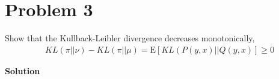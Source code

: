 \documentclass[5pt]{article}
\newcommand{\E}{\mathrm{E}}
\begin{document}
\pagebreak

\section{Problem 3}
Show that the Kullback-Leibler divergence decreases monotonically,
\begin{align}
	& KL \left( \pi || \nu \right) - KL \left( \pi || \mu \right) = \E\left[
	KL \left( P \left( y, x \right) || Q\left( y, x \right) \right] \geq 0
\end{align}


\textbf{Solution} \\
\end{document}
